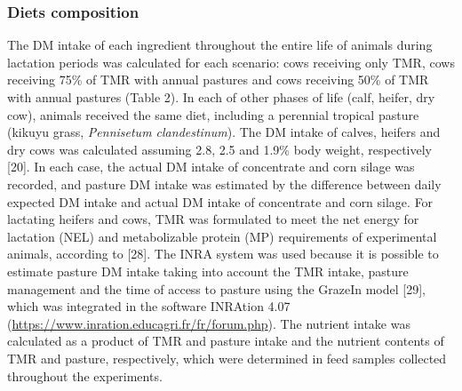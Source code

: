 \documentclass[11pt,a4paper]{article}
\begin{document}
\subsubsection{Diets composition}

The DM intake of each ingredient throughout the entire life of animals during lactation periods was calculated for each scenario: cows receiving only TMR, cows receiving 75\% of TMR with annual pastures and cows receiving 50\% of TMR with annual pastures (Table 2). In each of other phases of life (calf, heifer, dry cow), animals received the same diet, including a perennial tropical pasture (kikuyu grass, \textit{Pennisetum clandestinum}). The DM intake of calves, heifers and dry cows was calculated assuming 2.8, 2.5 and 1.9\% body weight, respectively [20]. In each case, the actual DM intake of concentrate and corn silage was recorded, and pasture DM intake was estimated by the difference between daily expected DM intake and actual DM intake of concentrate and corn silage. For lactating heifers and cows, TMR was formulated to meet the net energy for lactation (NEL) and metabolizable protein (MP) requirements of experimental animals, according to [28]. The INRA system was used because it is possible to estimate pasture DM intake taking into account the TMR intake, pasture management and the time of access to pasture using the GrazeIn model [29], which was integrated in the software INRAtion 4.07 (\href{https://www.inration.educagri.fr/fr/forum.php}{https://www.inration.educagri.fr/fr/forum.php}). The nutrient intake was calculated as a product of TMR and pasture intake and the nutrient contents of TMR and pasture, respectively, which were determined in feed samples collected throughout the experiments.
\end{document}
